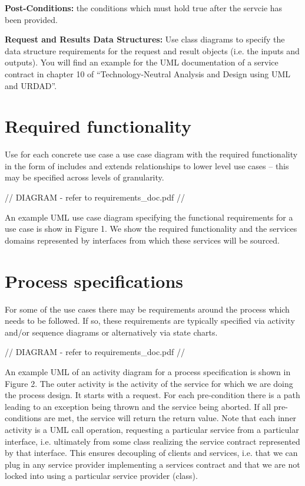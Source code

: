 \documentclass{scrreprt}
\begin{document}
\textbf{Post-Conditions:} the conditions which must hold true after the servcie has been provided. 

\textbf{Request and Results Data Structures:} Use class diagrams to specify the data structure requirements for the request and result objects (i.e. the inputs and outputs).
You will find an example for the UML documentation of a service contract in chapter 10 of “Technology-Neutral Analysis and Design using UML and URDAD”.

\section{Required functionality}
Use for each concrete use case a use case diagram with the required functionality in the form of includes and extends relationships to lower level use cases – this may be specified across levels of granularity.


// DIAGRAM - refer to requirements_doc.pdf //


An example UML use case diagram specifying the functional requirements for a use case is show in Figure 1. We show the required functionality and the services domains represented by interfaces from which these services will be sourced.


\section{Process specifications}
For some of the use cases there may be requirements around the process which needs to be followed. If so, these requirements are typically specified via activity and/or sequence diagrams or alternatively via state charts.


// DIAGRAM - refer to requirements_doc.pdf //


An example UML of an activity diagram for a process specification is shown in Figure 2. The outer activity is the activity of the service for which we are doing the process design. It starts with a request. For each pre-condition there is a path leading to an exception being thrown and the service being aborted. If all pre-conditions are met, the service will return the return value. Note that each inner activity is a UML call operation, requesting a particular service from a particular interface, i.e. ultimately from some class realizing the service contract represented by that interface. This ensures decoupling of clients and services, i.e. that we can plug in any service provider implementing a services contract and that we are not locked into using a particular service provider (class).
\end{document}
